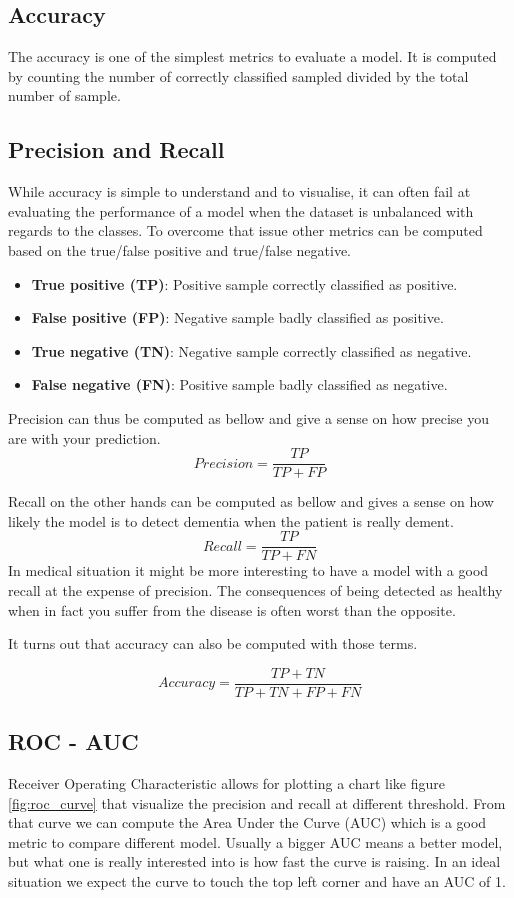 \subsection{Accuracy}
The accuracy is one of the simplest metrics to evaluate a model. It is computed by counting the number of correctly classified sampled divided by the total number of sample.


\subsection{Precision and Recall}
While accuracy is simple to understand and to visualise, it can often fail at evaluating the performance of a model when the dataset is unbalanced with regards to the classes. To overcome that issue other metrics can be computed based on the true/false positive and true/false negative.

\begin{itemize}
    \item \textbf{True positive (TP)}: Positive sample correctly classified as positive. 
    \item \textbf{False positive (FP)}: Negative sample badly classified as positive. 
    \item \textbf{True negative (TN)}: Negative sample correctly classified as negative. 
    \item \textbf{False negative (FN)}: Positive sample badly classified as negative.
\end{itemize}

Precision can thus be computed as bellow and give a sense on how precise you are with your prediction.
$$Precision = \frac{TP}{TP +  FP}$$

Recall on the other hands can be computed as bellow and gives a sense on how likely the model is to detect dementia when the patient is really dement.
$$Recall =\frac{TP}{TP + FN}$$
In medical situation it might be more interesting to have a model with a good recall at the expense of precision. The consequences of being detected as healthy when in fact you suffer from the disease is often worst than the opposite. 

It turns out that accuracy can also be computed with those terms.


$$Accuracy = \frac{TP + TN}{TP + TN + FP + FN}$$


\subsection{ROC - AUC}
Receiver Operating Characteristic allows for plotting a chart like figure \ref{fig:roc_curve} that visualize the precision and recall at different threshold. From that curve we can compute the Area Under the Curve (AUC) which is a good metric to compare different model. Usually a bigger AUC means a better model, but what one is really interested into is how fast the curve is raising. 
In an ideal situation we expect the curve to touch the top left corner and have an AUC of 1.

